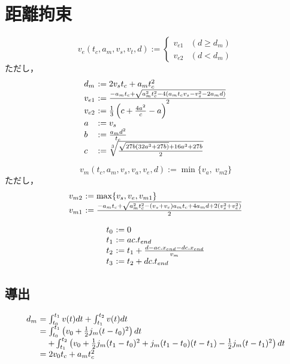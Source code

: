 \documentclass[a5paper]{ltjsarticle}
\begin{document}
\section{距離拘束}

$$
    v_e(t_c, a_m, v_s, v_t, d) :=
    \left\{\begin{array}{ll}
        v_{e1} & (d        \ge d_m)
        \\
        v_{e2} & (d < d_m)
    \end{array}\right.
$$
ただし，
$$
    \begin{array}{l@{~}l}
        d_m    & := 2 v_s t_c + a_m t_c^2
        \\
        v_{e1} & :=
        \frac{-a_m t_c + \sqrt{a_m^2 t_c^2-4(a_m t_c v_s - v_s^2 - 2a_m d)}}{2}
        \\
        v_{e2} & :=
        \frac{1}{3}\left(c +\frac{4a^2}{c}
        -a
        \right)
        \\
        a      & := v_s
        \\
        b      & :=                       \frac{a_md^2}{t_c}
        \\
        c      & :=                       \sqrt[3]{\frac{\sqrt{27b(32a^3+27b)} + 16a^3+27b}{2}}
    \end{array}
$$

$$
    v_m(t_c, a_m, v_s, v_a, v_e, d) := \min\{v_a,~v_{m2}\}
$$
ただし，
$$
    \begin{array}{l@{~}l}
        v_{m2} & := \max\{v_s, v_e, v_{m1}\}                                                   \\
        v_{m1} & := \frac{-a_mt_c + \sqrt{a_m^2t_c^2-(v_s+v_e)a_mt_c+4a_md+2(v_s^2+v_e^2)}}{2}
    \end{array}
$$

$$
    \begin{array}{l@{~}l}
        t_0 & := 0
        \\
        t_1 & := ac.t_{end}
        \\
        t_2 & := t_1 +             \frac{d - ac.x_{end} - dc.x_{end}}{v_m}
        \\
        t_3 & := t_2 + dc.t_{end}
    \end{array}
$$

\subsection{導出}

$$
    \begin{array}{l@{~}l}
        d_m & =                  \int_{t_0}^{t_1}v(t) dt + \int_{t_1}^{t_2}v(t) dt
        \\
            & =                  \int_{t_0}^{t_1}\left( v_0+\frac{1}{2} j_m(t-t_0)^2 \right) dt
        \\
            & \quad+ \int_{t_1}^{t_2}\left(
        v_0+                     \frac{1}{2} j_m(t_1-t_0)^2
        +j_m(t_1-t_0)(t-t_1) -   \frac{1}{2}j_m(t-t_1)^2
        \right) dt
        \\
            & = 2v_0t_c+a_mt_c^2
    \end{array}
$$
\end{document}
